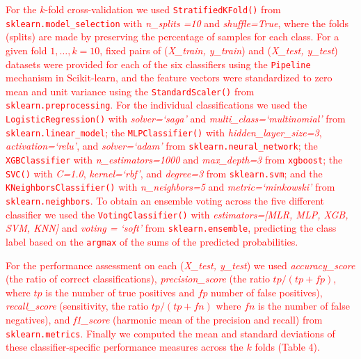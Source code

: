 \documentclass[10pt,letterpaper]{article}
\begin{document}
{{\textcolor{red}{For the $k$-fold cross-validation we used  {\tt \small StratifiedKFold()}  from {\tt \small sklearn.model\_selection}  with {\it n\_splits =10} and {\it shuffle=True}, 
where the folds (splits) are made by preserving the percentage of samples for each class. For a given fold $1,\ldots,k=10$, 
fixed pairs of ({\it X\_train, y\_train}) and ({\it X\_test, y\_test}) datasets were provided for each of the six classifiers 
using the {\tt Pipeline} mechanism in Scikit-learn, and the feature vectors were standardized to zero mean and unit variance using the
{\tt \small StandardScaler()} from {\tt \small sklearn.preprocessing}.
For the individual classifications we used the {\tt \small LogisticRegression()} with {\it solver=`saga'} and {\it multi\_class=`multinomial'} from  
{\tt \small sklearn.linear\_model};  the
{\tt \small MLPClassifier()} with {\it hidden\_layer\_size=3}, {\it activation=`relu'}, and {\it solver=`adam'} from {\tt \small sklearn.neural\_network}; 
the {\tt \small XGBClassifier} with {\it n\_estimators=1000} and {\it max\_depth=3} from {\tt \small xgboost}; 
the {\tt \small SVC()} with {\it C=1.0}, {\it kernel=`rbf'}, and {\it degree=3} from {\tt \small sklearn.svm};  and the {\tt \small KNeighborsClassifier()} with
{\it n\_neighbors=5} and {\it metric=`minkowski'} from {\tt \small sklearn.neighbors}. 
To obtain an ensemble voting across the five different classifier we used the  {\tt VotingClassifier()}  with 
{\it estimators=[MLR, MLP, XGB, SVM, KNN]} and {\it  voting = `soft'}  from {\tt \small sklearn.ensemble},
predicting the class label based on the {\tt \small argmax} of the sums of the predicted probabilities.}

\textcolor{red}{For the performance assessment on each ({\it X\_test, y\_test}) we used {\it accuracy\_score} (the ratio of correct classifications), {\it precision\_score} 
(the ratio $tp / (tp + f\!p)$, where $t\!p$ is the number of true positives and $f\!p$ number of false positives), {\it recall\_score} (sensitivity, the ratio $tp / (tp + f\!n)$ 
where $f\!n$ is the number of false negatives), and {\it f1\_score} (harmonic mean of the precision and recall) from {\tt sklearn.metrics}.
Finally we computed the mean and standard deviations of these classifier-specific performance measures across the $k$ folds (Table 4). }


}}
\end{document}
